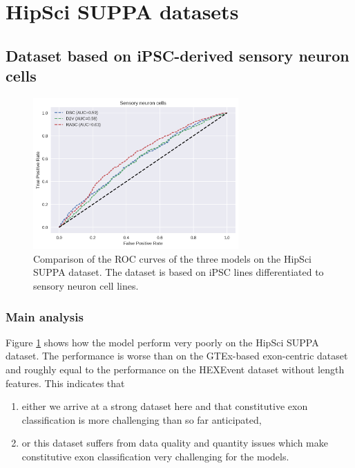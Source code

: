 



\section{HipSci SUPPA datasets} \label{subsec:hipsci_suppa}
\subsection{Dataset based on iPSC-derived sensory neuron cells}

\begin{figure}
	\centering\includegraphics[width=0.7\textwidth]{../visualizations/ch5-results/suppa_cross_model_roc_auc_comparison.png} 
	\caption{Comparison of the ROC curves of the three models on the HipSci SUPPA dataset. The dataset is based on iPSC lines differentiated to sensory neuron cell lines. }
	\label{fig:suppa_auc_roc}
\end{figure}
\subsubsection{Main analysis}
Figure \ref{fig:suppa_auc_roc} shows how the model perform very poorly on the HipSci SUPPA dataset. The performance is worse than on the GTEx-based exon-centric dataset and roughly equal to the performance on the HEXEvent dataset without length features. This indicates that 
\begin{enumerate}
	\item either we arrive at a strong dataset here and that constitutive exon classification is more challenging than so far anticipated,
	\item or this dataset suffers from data quality and quantity issues which make constitutive exon classification very challenging for the models.
\end{enumerate}

